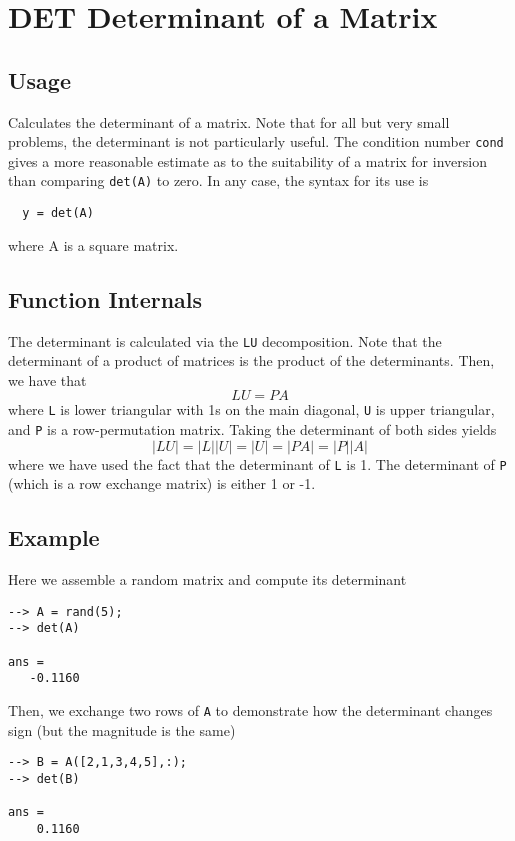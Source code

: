 \section{DET Determinant of a Matrix}

\subsection{Usage}

Calculates the determinant of a matrix.  Note that for all but
very small problems, the determinant is not particularly useful.
The condition number \verb|cond| gives a more reasonable estimate as
to the suitability of a matrix for inversion than comparing \verb|det(A)|
to zero.  In any case, the syntax for its use is
\begin{verbatim}
  y = det(A)
\end{verbatim}
where A is a square matrix.
\subsection{Function Internals}

The determinant is calculated via the \verb|LU| decomposition.  Note that
the determinant of a product of matrices is the product of the 
determinants.  Then, we have that 
\[
  L U = P A
\]
where \verb|L| is lower triangular with 1s on the main diagonal, \verb|U| is
upper triangular, and \verb|P| is a row-permutation matrix.  Taking the
determinant of both sides yields
\[
 |L U| = |L| |U| = |U| = |P A| = |P| |A|
\]
where we have used the fact that the determinant of \verb|L| is 1.  The
determinant of \verb|P| (which is a row exchange matrix) is either 1 or 
-1.
\subsection{Example}

Here we assemble a random matrix and compute its determinant
\begin{verbatim}
--> A = rand(5);
--> det(A)

ans = 
   -0.1160 
\end{verbatim}
Then, we exchange two rows of \verb|A| to demonstrate how the determinant
changes sign (but the magnitude is the same)
\begin{verbatim}
--> B = A([2,1,3,4,5],:);
--> det(B)

ans = 
    0.1160 
\end{verbatim}
